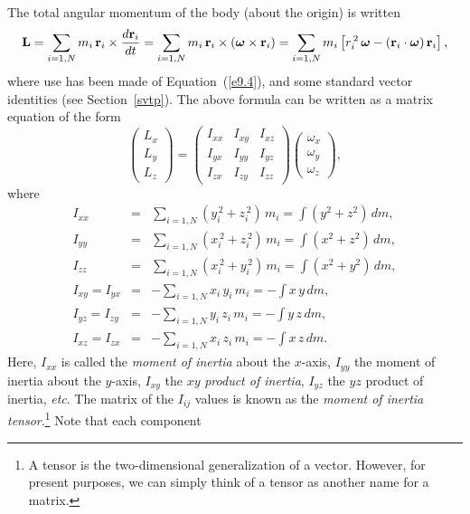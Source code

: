 The total angular momentum of the body (about the origin) is written
\begin{equation}\label{e9.5}
{\bf L} = \sum_{i=1,N} m_i\,{\bf r}_i\times\frac{d{\bf r}_i}{dt} = 
\sum_{i=1,N}m_i\,{\bf r}_i\times(\mbox{\boldmath$\omega$}\times {\bf r}_i) = \sum_{i=1,N}m_i\left[r_i^{\,2}\,\mbox{\boldmath$\omega$}- ({\bf r}_i\cdot\mbox{\boldmath$\omega$})\,{\bf r}_i\right],
\end{equation}
where use has been made of Equation~(\ref{e9.4}), and some standard vector
identities (see Section~\ref{svtp}). The above formula can be written as a matrix equation
of the form
\begin{equation}\label{e9.6}
\left(\begin{array}{c}L_x\\L_y\\L_z\end{array}\right)=
\left(\begin{array}{ccc}
I_{xx}&I_{xy}&I_{xz}\\
I_{yx}&I_{yy}&I_{yz}\\
I_{zx}&I_{zy}&I_{zz}
\end{array}\right)\left(\begin{array}{c}\omega_x\\\omega_y\\\omega_z\end{array}\right),
\end{equation}
where
\begin{eqnarray}\label{e9.7}
I_{xx} &=& \sum_{i=1,N}(y_i^{\,2}+z_i^{\,2}) \,m_i= \int(y^2+ z^2)\,dm,\\[0.5ex]
I_{yy} &=& \sum_{i=1,N}(x_i^{\,2}+z_i^{\,2}) \,m_i= \int(x^2+ z^2)\,dm,\\[0.5ex]
I_{zz} &=& \sum_{i=1,N}(x_i^{\,2}+y_i^{\,2}) \,m_i= \int(x^2+ y^2)\,dm,\\[0.5ex]
I_{xy}=I_{yx} &=& - \sum_{i=1,N}x_i\,y_i \,m_i=- \int x\,y\,dm,\label{e9.11}\\[0.5ex]
I_{yz}=I_{zy} &=& - \sum_{i=1,N}y_i\,z_i \,m_i= -\int y\,z\,dm,\label{e9.12}\\[0.5ex]
I_{xz}=I_{zx} &=& - \sum_{i=1,N}x_i\,z_i \,m_i= -\int x\,z\,dm.\label{e9.13a}
\end{eqnarray}
Here, $I_{xx}$ is called the {\em moment of inertia}\/ about the $x$-axis,
$I_{yy}$  the moment of inertia about the $y$-axis, $I_{xy}$ 
the $xy$ {\em product of inertia}, $I_{yz}$  the $yz$ product of
inertia, {\em etc}. The matrix of the $I_{ij}$ values is
known as the {\em moment of inertia tensor}.\footnote{A tensor is the two-dimensional generalization of a vector. However, for present purposes, we can
simply think of a tensor as another name for a matrix.} Note that each component
